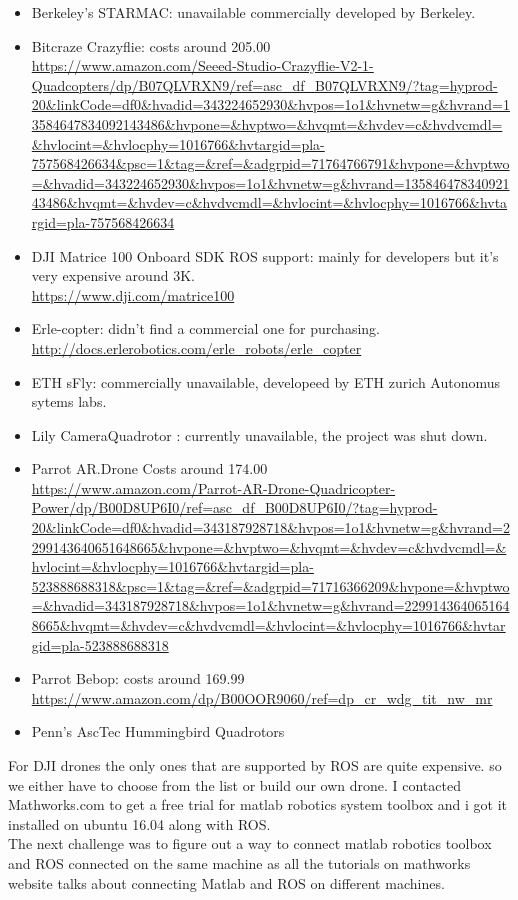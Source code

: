 \documentclass[fontsize=11pt, %
                             paper=letter, %
                             twoside, %
                             captions=tableheading,
                             index=totoc,
                             hyperref]{labbook}
\begin{document}
\begin{addmargin}[0cm]{0cm}
\begin{itemize}
\item Berkeley’s STARMAC: unavailable commercially developed by Berkeley. 
\item Bitcraze Crazyflie: costs around 205.00 
\\
\url {https://www.amazon.com/Seeed-Studio-Crazyflie-V2-1-Quadcopters/dp/B07QLVRXN9/ref=asc_df_B07QLVRXN9/?tag=hyprod-20&linkCode=df0&hvadid=343224652930&hvpos=1o1&hvnetw=g&hvrand=13584647834092143486&hvpone=&hvptwo=&hvqmt=&hvdev=c&hvdvcmdl=&hvlocint=&hvlocphy=1016766&hvtargid=pla-757568426634&psc=1&tag=&ref=&adgrpid=71764766791&hvpone=&hvptwo=&hvadid=343224652930&hvpos=1o1&hvnetw=g&hvrand=13584647834092143486&hvqmt=&hvdev=c&hvdvcmdl=&hvlocint=&hvlocphy=1016766&hvtargid=pla-757568426634
}
\item DJI Matrice 100 Onboard SDK ROS support: mainly for developers but it's very expensive around 3K.
\\
\url {https://www.dji.com/matrice100}
\item Erle-copter: didn't find a commercial one for purchasing. 
\\
\url {http://docs.erlerobotics.com/erle_robots/erle_copter}

\item ETH sFly: commercially unavailable, developeed by ETH zurich Autonomus sytems labs. 
\item Lily CameraQuadrotor : currently unavailable, the project was shut down. 
\item Parrot AR.Drone
Costs around 174.00 
\\
\url{
https://www.amazon.com/Parrot-AR-Drone-Quadricopter-Power/dp/B00D8UP6I0/ref=asc_df_B00D8UP6I0/?tag=hyprod-20&linkCode=df0&hvadid=343187928718&hvpos=1o1&hvnetw=g&hvrand=2299143640651648665&hvpone=&hvptwo=&hvqmt=&hvdev=c&hvdvcmdl=&hvlocint=&hvlocphy=1016766&hvtargid=pla-523888688318&psc=1&tag=&ref=&adgrpid=71716366209&hvpone=&hvptwo=&hvadid=343187928718&hvpos=1o1&hvnetw=g&hvrand=2299143640651648665&hvqmt=&hvdev=c&hvdvcmdl=&hvlocint=&hvlocphy=1016766&hvtargid=pla-523888688318
}
\item Parrot Bebop: costs around 169.99
\\
\url{https://www.amazon.com/dp/B00OOR9060/ref=dp_cr_wdg_tit_nw_mr} 

\item Penn’s AscTec Hummingbird Quadrotors


\end{itemize}

For DJI drones the only ones that are supported by ROS are quite expensive. so we either have to choose from the list or build our own drone. 
I contacted Mathworks.com to get a free trial for matlab robotics system toolbox and i got it installed on ubuntu 16.04 along with ROS. 
\\ The next challenge was to figure out a way to connect matlab robotics toolbox and ROS connected on the same machine as all the tutorials on mathworks website talks about connecting Matlab and ROS on different machines.


\end{addmargin}
\end{document}
